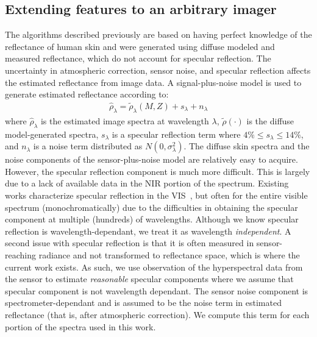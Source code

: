 \documentclass[10pt,journal,cspaper,compsoc]{IEEEtran}
\begin{document}
\subsection{Extending features to an arbitrary imager}
\label{scn:sig_plus_noise}
The algorithms described previously are based on having perfect knowledge of the reflectance of human skin and were 
generated using diffuse modeled and measured reflectance, which do not account for specular reflection.  The uncertainty 
in atmospheric correction, sensor noise, and specular reflection affects the estimated reflectance from image data. 
A signal-plus-noise model is used to generate estimated reflectance according to:
\begin{align}
\label{eqn:signal_plus_noise}
\hat{\rho}_{\lambda} = \tilde{\rho}_{\lambda}\left(M,Z\right) + s_{\lambda} + n_{\lambda}
\end{align}
\noindent where $\hat{\rho}_{\lambda}$ is the estimated image spectra at wavelength $\lambda$, $\tilde{\rho}\left(\cdot\right)$ is 
the diffuse model-generated spectra, $s_{\lambda}$ is a specular reflection term where $4\% \leq s_{\lambda} \leq 14\%$, and $n_{\lambda}$ is a noise 
term distributed as $N\left(0,\sigma^2_{\lambda}\right)$. The diffuse skin spectra and the noise components of the sensor-plus-noise model 
are relatively easy to acquire.  However, the specular reflection component is much more difficult. This is largely due to a lack of 
available data in the NIR portion of the spectrum.  Existing works characterize specular reflection in the VIS~\cite{marschner99}, but 
often for the entire visible spectrum (monochromatically) due to the difficulties in obtaining the specular component at multiple (hundreds) 
of wavelengths.  Although we know specular reflection is wavelength-dependant, we treat it as wavelength \emph{independent}.  A second issue 
with specular reflection is that it is often measured in sensor-reaching radiance and not transformed to reflectance space, which is 
where the current work exists.  As such, we use 
observation of the hyperspectral data from the sensor to estimate \emph{reasonable} specular components where we assume that specular component is 
not wavelength dependant.  The sensor noise component is spectrometer-dependant and is assumed to be the noise term in 
estimated reflectance (that is, after atmospheric correction).  We compute this term for each portion of the spectra used in this work. 
\end{document}
